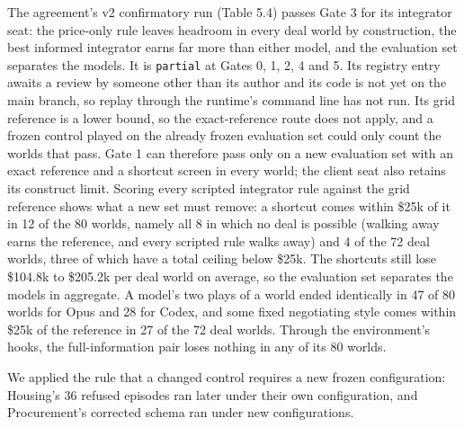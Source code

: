 The agreement's v2 confirmatory run (Table 5.4) passes Gate 3 for its integrator seat: the price-only rule leaves
headroom in every deal world by construction, the best informed integrator earns far more than either model, and the
evaluation set separates the models. It is \texttt{partial} at Gates 0, 1, 2, 4 and 5. Its registry entry awaits a review by
someone other than its author and its code is not yet on the main branch, so replay through the runtime's command line
has not run. Its grid reference is a lower bound, so the exact-reference route does not apply, and a frozen control played on the
already frozen evaluation set could only count the worlds that pass. Gate 1 can therefore pass only on a new
evaluation set with an exact reference and a shortcut screen in every world; the client seat also retains its
construct limit. Scoring every scripted integrator rule against the grid reference shows what a new set must remove: a shortcut comes within \$25k of it in 12 of the 80 worlds, namely all 8 in which no deal is possible (walking
away earns the reference, and every scripted rule walks away) and 4 of the 72 deal worlds, three of which have a total
ceiling below \$25k. The shortcuts still lose \$104.8k to \$205.2k per deal world on average, so the evaluation set
separates the models in aggregate. A model's two plays of a world ended identically in 47 of 80 worlds for Opus and 28
for Codex, and some fixed negotiating style comes within \$25k of the reference in 27 of the 72 deal worlds. Through the
environment's hooks, the full-information pair loses nothing in any of its 80 worlds.

We applied the rule that a changed control requires a new frozen configuration: Housing's 36 refused episodes ran
later under their own configuration, and Procurement's corrected schema ran under new configurations.

